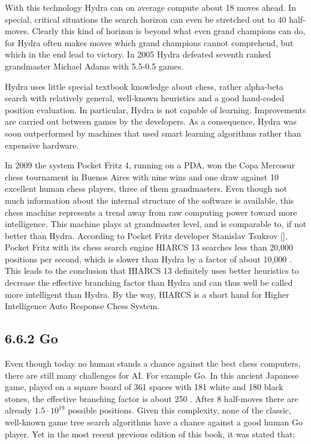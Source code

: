 \documentclass[10pt]{article}
\begin{document}
With this technology Hydra can on average compute about 18 moves ahead. In special, critical situations the search horizon can even be stretched out to 40 half-moves. Clearly this kind of horizon is beyond what even grand champions can do, for Hydra often makes moves which grand champions cannot comprehend, but which in the end lead to victory. In 2005 Hydra defeated seventh ranked grandmaster Michael Adams with 5.5-0.5 games.

Hydra uses little special textbook knowledge about chess, rather alpha-beta search with relatively general, well-known heuristics and a good hand-coded\\
position evaluation. In particular, Hydra is not capable of learning. Improvements are carried out between games by the developers. As a consequence, Hydra was soon outperformed by machines that used smart learning algorithms rather than expensive hardware.


In 2009 the system Pocket Fritz 4, running on a PDA, won the Copa Mercosur chess tournament in Buenos Aires with nine wins and one draw against 10 excellent human chess players, three of them grandmasters. Even though not much information about the internal structure of the software is available, this chess machine represents a trend away from raw computing power toward more intelligence. This machine plays at grandmaster level, and is comparable to, if not better than Hydra. According to Pocket Fritz developer Stanislav Tsukrov [\cite{wikipedia2013}], Pocket Fritz with its chess search engine HIARCS 13 searches less than 20,000 positions per second, which is slower than Hydra by a factor of about 10,000 . This leads to the conclusion that HIARCS 13 definitely uses better heuristics to decrease the effective branching factor than Hydra and can thus well be called more intelligent than Hydra. By the way, HIARCS is a short hand for Higher Intelligence Auto Response Chess System.

\subsection*{6.6.2 Go}
Even though today no human stands a chance against the best chess computers, there are still many challenges for AI. For example Go. In this ancient Japanese game, played on a square board of 361 spaces with 181 white and 180 black stones, the effective branching factor is about 250 . After 8 half-moves there are already $1.5 \cdot 10^{19}$ possible positions. Given this complexity, none of the classic, well-known game tree search algorithms have a chance against a good human Go player. Yet in the most recent previous edition of this book, it was stated that:
\end{document}

